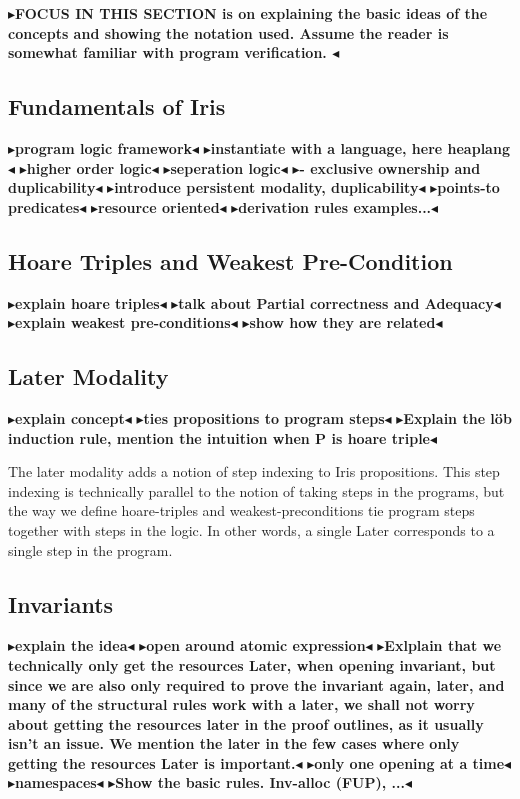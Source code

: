 \documentclass[a4paper, 10pt]{report}
\theoremstyle{definition}
\newcommand{\todo}[1]{{\color[rgb]{.5,0,0}\textbf{$\blacktriangleright$#1$\blacktriangleleft$}}}
\begin{document}
\todo{FOCUS IN THIS SECTION is on explaining the basic ideas of the concepts and showing the notation used. Assume the reader is somewhat familiar with program verification. }

\subsection{Fundamentals of Iris}
\todo{program logic framework}
\todo{instantiate with a language, here heaplang}
\todo{higher order logic}
\todo{seperation logic}
\todo{- exclusive ownership and duplicability}
\todo{introduce persistent modality, duplicability}
\todo{points-to predicates}
\todo{resource oriented}
\todo{derivation rules examples...}

\subsection{Hoare Triples and Weakest Pre-Condition}
\todo{explain hoare triples}
\todo{talk about Partial correctness and Adequacy}
\todo{explain weakest pre-conditions}
\todo{show how they are related}

\subsection{Later Modality}
\todo{explain concept}
\todo{ties propositions to program steps}
\todo{Explain the löb induction rule, mention the intuition when P is hoare triple}

The later modality adds a notion of step indexing to Iris propositions. This step indexing is technically parallel to the notion of taking steps in the programs, but the way we define hoare-triples and weakest-preconditions tie program steps together with steps in the logic. In other words, a single Later corresponds to a single step in the program.

\subsection{Invariants}
\todo{explain the idea}
\todo{open around atomic expression}
\todo{Exlplain that we technically only get the resources Later, when opening invariant, but since we are also only required to prove the invariant again, later, and many of the structural rules work with a later, we shall not worry about getting the resources later in the proof outlines, as it usually isn't an issue. We mention the later in the few cases where only getting the resources Later is important.}
\todo{only one opening at a time}
\todo{namespaces}
\todo{Show the basic rules. Inv-alloc (FUP), ...}
\end{document}
